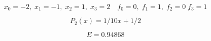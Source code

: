\[ x_0=-2, \; x_1=-1, \; x_2=1, \; x_3=2 \quad f_0=0, \; f_1=1, \; f_2=0 \; f_3=1 \]

\[ P_2(x)=1/10 x + 1/2 \]

\[ E=0.94868 \]

